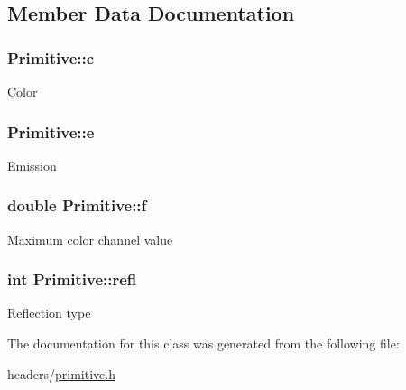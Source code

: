 \subsection{\-Member \-Data \-Documentation}
\hypertarget{class_primitive_a3952aadb4a03a2e98e6ba5bdfbd0842f}{
\subsubsection[{c}]{ {\bf \-Primitive\-::c}}}
\label{class_primitive_a3952aadb4a03a2e98e6ba5bdfbd0842f}
\-Color \hypertarget{class_primitive_aa60d41fbc09fbf11f6dd24b6e0252c5d}{
\subsubsection[{e}]{ {\bf \-Primitive\-::e}}}
\label{class_primitive_aa60d41fbc09fbf11f6dd24b6e0252c5d}
\-Emission \hypertarget{class_primitive_a6e6c2ea0ddfaaca10a3b18bb08af0706}{
\subsubsection[{f}]{\setlength{\rightskip}{0pt plus 5cm}double {\bf \-Primitive\-::f}}}
\label{class_primitive_a6e6c2ea0ddfaaca10a3b18bb08af0706}
\-Maximum color channel value \hypertarget{class_primitive_a39a03ec4e90d63a30e1594b4d396fa77}{
\subsubsection[{refl}]{\setlength{\rightskip}{0pt plus 5cm}int {\bf \-Primitive\-::refl}}}
\label{class_primitive_a39a03ec4e90d63a30e1594b4d396fa77}
\-Reflection type 

\-The documentation for this class was generated from the following file\-:\begin{DoxyCompactItemize}
\item 
headers/\hyperlink{primitive_8h}{primitive.\-h}\end{DoxyCompactItemize}
